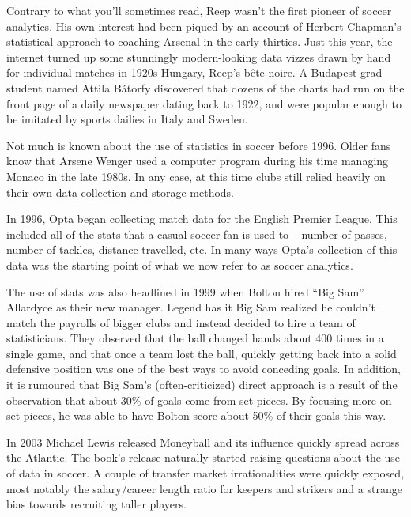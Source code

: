 Contrary to what you’ll sometimes read, Reep wasn’t the first pioneer of 
soccer analytics. His own interest had been piqued by an account of Herbert 
Chapman’s statistical approach to coaching Arsenal in the early thirties. 
Just this year, the internet turned up some stunningly modern-looking 
data vizzes drawn by hand for individual matches in 1920s Hungary, Reep’s 
bête noire. A Budapest grad student named Attila Bátorfy discovered that 
dozens of the charts had run on the front page of a daily newspaper dating 
back to 1922, and were popular enough to be imitated by sports dailies in 
Italy and Sweden.

Not much is known about the use of statistics in soccer before 1996. Older 
fans know that Arsene Wenger used a computer program during his time 
managing Monaco in the late 1980s. In any case, at this time clubs still 
relied heavily on their own data collection and storage methods.

In 1996, Opta began collecting match data for the English Premier League. 
This included all of the stats that a casual soccer fan is used to – number 
of passes, number of tackles, distance travelled, etc. In many ways Opta’s 
collection of this data was the starting point of what we now refer to as 
soccer analytics.

The use of stats was also headlined in 1999 when Bolton hired “Big Sam” Allardyce 
as their new manager. Legend has it Big Sam realized he couldn’t match 
the payrolls of bigger clubs and instead decided to hire a team of 
statisticians. They observed that the ball changed hands about 400 
times in a single game, and that once a team lost the ball, quickly 
getting back into a solid defensive position was one of the best ways 
to avoid conceding goals. In addition, it is rumoured that Big Sam’s 
(often-criticized) direct approach is a result of the observation that 
about 30\% of goals come from set pieces. By focusing more on set pieces, 
he was able to have Bolton score about 50\% of their goals this way.

In 2003 Michael Lewis released Moneyball and its influence quickly spread 
across the Atlantic. The book’s release naturally started raising questions 
about the use of data in soccer. A couple of transfer market irrationalities 
were quickly exposed, most notably the salary/career length ratio for keepers 
and strikers and a strange bias towards recruiting taller players.

